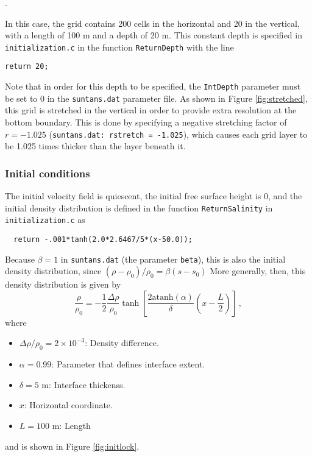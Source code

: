 \medskip
\noindent
\mfiledownload.

\medskip
\noindent
In this case, the grid contains 200 cells in the horizontal and 20 in the vertical, with
a length of 100 m and a depth of 20 m.  This constant depth is specified in \verb+initialization.c+
in the function \verb+ReturnDepth+ with the line
\begin{verbatim}
return 20;
\end{verbatim}
Note that in order for this depth to be specified, the \verb+IntDepth+ parameter must
be set to 0 in the \verb+suntans.dat+ parameter file.  As shown in Figure \ref{fig:stretched},
this grid is stretched in the
vertical in order to provide extra resolution at the bottom boundary.  This is done by
specifying a negative stretching factor of $r=-1.025$ (\verb+suntans.dat: rstretch = -1.025+),
which causes each grid layer to be 1.025 times thicker than the layer beneath it.  

\subsubsection{Initial conditions}

The initial velocity field is quiescent, the initial free surface height is 0,
and the initial density distribution is defined in the function \verb+ReturnSalinity+
in \verb+initialization.c+ as
\begin{verbatim}
  return -.001*tanh(2.0*2.6467/5*(x-50.0));
\end{verbatim}
Because $\beta=1$ in \verb+suntans.dat+ (the parameter \verb+beta+), this is also the initial density 
distribution, since $(\rho-\rho_0)/\rho_0 = \beta(s-s_0)$ More generally, then, 
this density distribution is given by
\[
\frac{\rho}{\rho_0} = -\frac{1}{2}\frac{\Delta\rho}{\rho_0}
\tanh\left[\frac{2\mbox{atanh}(\alpha)}{\delta}\left(x-\frac{L}{2}\right)\right]\,,
\]
where
\begin{itemize}
\item $\Delta\rho/\rho_0=2\times 10^{-3}$: Density difference.
\item $\alpha=0.99$: Parameter that defines interface extent.
\item $\delta=5$ m: Interface thickenss.
\item $x$: Horizontal coordinate.
\item $L=100$ m: Length
\end{itemize}
and is shown in Figure \ref{fig:initlock}. 

